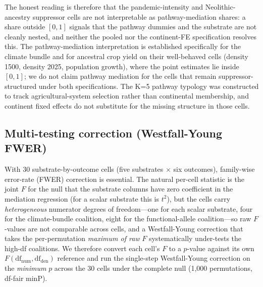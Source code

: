 \documentclass[11pt,letterpaper]{article}
\begin{document}
The honest reading is therefore that the pandemic-intensity and Neolithic-ancestry suppressor cells are not interpretable as pathway-mediation shares: a share outside $[0,1]$ signals that the pathway dummies and the substrate are not cleanly nested, and neither the pooled nor the continent-FE specification resolves this. The pathway-mediation interpretation is established specifically for the climate bundle and for ancestral crop yield on their well-behaved cells (density 1500, density 2025, population growth), where the point estimates lie inside $[0,1]$; we do not claim pathway mediation for the cells that remain suppressor-structured under both specifications. The K=5 pathway typology was constructed to track agricultural-system selection rather than continental membership, and continent fixed effects do not substitute for the missing structure in those cells.

\subsection{Multi-testing correction (Westfall-Young FWER)}
\label{sec:wy-correction}

With 30 substrate-by-outcome cells (five substrates $\times$ six outcomes), family-wise error-rate (FWER) correction is essential. The natural per-cell statistic is the joint $F$ for the null that the substrate columns have zero coefficient in the mediation regression (for a scalar substrate this is $t^2$), but the cells carry \emph{heterogeneous} numerator degrees of freedom---one for each scalar substrate, four for the climate-bundle coalition, eight for the functional-allele coalition---so raw $F$-values are not comparable across cells, and a Westfall-Young correction that takes the per-permutation \emph{maximum of raw} $F$ systematically under-tests the high-df coalitions. We therefore convert each cell's $F$ to a $p$-value against its own $F(\mathrm{df}_{\text{num}},\mathrm{df}_{\text{den}})$ reference and run the single-step Westfall-Young correction on the \emph{minimum} $p$ across the 30 cells under the complete null (1{,}000 permutations, df-fair minP).
\end{document}
